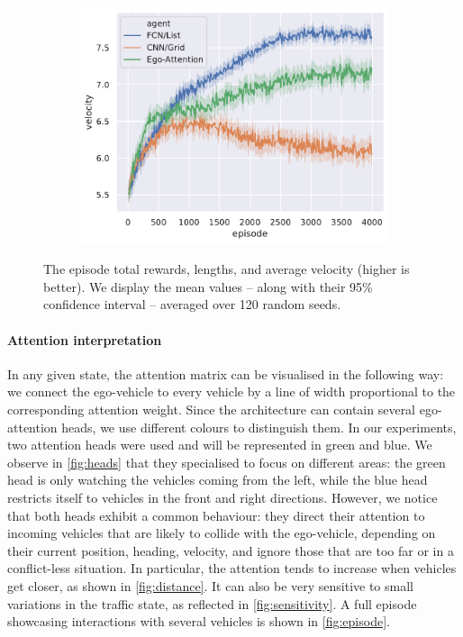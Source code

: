 \documentclass{article}
\begin{document}
\begin{figure}[htp]
\begin{subfigure}[t]{.49\linewidth}
		\centering\includegraphics[width=\linewidth]{img/velocity}
	\end{subfigure}
 \caption{The episode total rewards, lengths, and average velocity (higher is better). We display the mean values -- along with their 95\% confidence interval -- averaged over 120 random seeds.}
 \label{fig:results}
\end{figure}

\paragraph{Attention interpretation}

In any given state, the attention matrix can be visualised in the following way: we connect the ego-vehicle to every vehicle by a line of width proportional to the corresponding attention weight. Since the architecture can contain several ego-attention heads, we use different colours to distinguish them. In our experiments, two attention heads were used and will be represented in green and blue. We observe in \autoref{fig:heads} that they specialised to focus on different areas: the green head is only watching the vehicles coming from the left, while the blue head restricts itself to vehicles in the front and right directions. However, we notice that both heads exhibit a common behaviour: they direct their attention to incoming vehicles that are likely to collide with the ego-vehicle, depending on their current position, heading, velocity, and ignore those that are too far or in a conflict-less situation. In particular, the attention tends to increase when vehicles get closer, as shown in \autoref{fig:distance}. It can also be very sensitive to small variations in the traffic state, as reflected in \autoref{fig:sensitivity}. A full episode showcasing interactions with several vehicles is shown in \autoref{fig:episode}.
\end{document}

